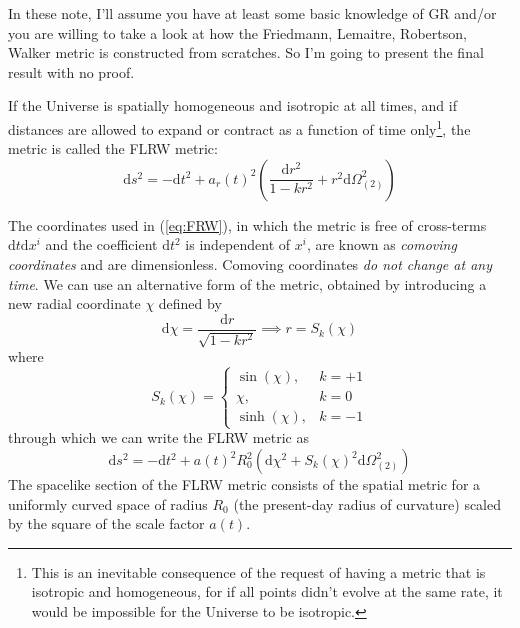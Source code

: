 In these note, I'll assume you have at least some basic knowledge of GR and/or you are willing to take a look at how the Friedmann, Lemaitre, Robertson, Walker metric is constructed from scratches. So I'm going to present the final result with no proof.
\par If the Universe is spatially homogeneous and isotropic at all times, and if distances are allowed to expand or contract as a function of time only\footnote{This is an inevitable consequence of the request of having a metric that is isotropic and homogeneous, for if all points didn't evolve at the same rate, it would be impossible for the Universe to be isotropic.}, the metric is called the FLRW metric:
\begin{equation}
    \text{d}s^{2} = -\text{d}t^{2}+a_{r}(t)^{2}\left(\frac{\text{d}r^{2}}{1-kr^{2}}+r^{2}\text{d}\Omega_{(2)}^{2}\right)
    \label{eq:FRW}
\end{equation}
\par The coordinates used in (\ref{eq:FRW}), in which the metric is free of cross-terms $\text{d}t\text{d}x^{i}$ and the coefficient $\text{d}t^{2}$ is independent of $x^{i}$, are known as \emph{comoving coordinates} and are dimensionless. Comoving coordinates \emph{do not change at any time}. We can use an alternative form of the metric, obtained by introducing a new radial coordinate $\chi$ defined by
\begin{equation}
    \text{d}\chi = \frac{\text{d}r}{\sqrt{1-kr^{2}}} \implies r = S_{k}(\chi)
    \label{eq:sphere_coordinate}
\end{equation}
where
\begin{equation}
    S_{k}(\chi) = 
    \left\{
    \begin{array}{ll}
        \sin(\chi), & k = +1\\
        \chi, & k = 0\\
        \sinh(\chi), & k = -1
    \end{array}
    \right.
    \label{eq:sphere_radius}
\end{equation}
through which we can write the FLRW metric as
\begin{equation}
    \text{d}s^{2} = -\text{d}t^{2}+a(t)^{2}R_{0}^{2}\left(\text{d}\chi^{2}+S_{k}(\chi)^{2}\text{d}\Omega_{(2)}^{2}\right)
    \label{eq:FRW_revisited}
\end{equation}
The spacelike section of the FLRW metric consists of the spatial metric for a uniformly curved space of radius $R_{0}$ (the present-day radius of curvature) scaled by the square of the scale factor $a(t)$.
